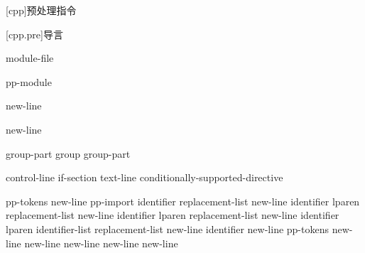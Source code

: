 [cpp]{预处理指令}%

%
%


[cpp.pre]{导言}

\begin{bnf}
\br
    \br
    module-file
\end{bnf}

\begin{bnf}
\br
     pp-module  
\end{bnf}

\begin{bnf}
\br
     \terminal{;} new-line 
\end{bnf}

\begin{bnf}
\br
     \terminal{:}  \terminal{;} new-line 
\end{bnf}

\begin{bnf}
\br
    group-part\br
    group group-part
\end{bnf}

\begin{bnf}
\br
    control-line\br
    if-section\br
    text-line\br
    \terminal{\#} conditionally-supported-directive
\end{bnf}

\begin{bnf}\obeyspaces
{}\br
     pp-tokens new-line\br
    pp-import\br
     identifier replacement-list new-line\br
     identifier lparen  \terminal{)} replacement-list new-line\br
     identifier lparen  replacement-list new-line\br
     identifier lparen identifier-list  replacement-list new-line\br
     identifier new-line\br
     pp-tokens new-line\br
      new-line\br
      new-line\br
      new-line\br
    \terminal{\# }new-line
\end{bnf}

